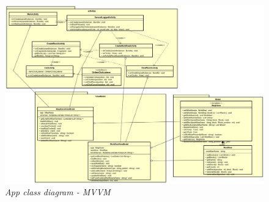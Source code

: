 \begin{figure} [H]
	\centering
	\includegraphics[scale=0.3]{./images/MVVM.png}
	\caption{\textit{App class diagram - MVVM}}\label{MVVM}
\end{figure}

